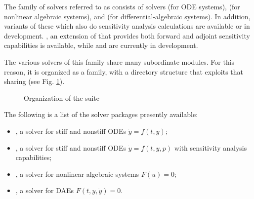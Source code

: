 %
The family of solvers referred to as {\sundials} consists of solvers
{\cvode} (for ODE systems), {\kinsol} (for nonlinear algebraic
systems), and {\ida} (for differential-algebraic systems).  In addition,
variants of these which also do sensitivity analysis calculations are
available or in development. {\cvodes}, an extension of {\cvode} that
provides both forward and adjoint sensitivity capabilities is available,
while {\idas} and {\kinsols} are currently in development.

The various solvers of this family share many subordinate modules.
For this reason, it is organized as a family, with a directory
structure that exploits that sharing (see Fig. \ref{f:sunorg}).
\begin{figure}
\caption {Organization of the {\sundials} suite}\label{f:sunorg}
\end{figure}
The following is a list of the solver packages presently available:
\begin{itemize}

\item {\cvode},  
  a solver for stiff and nonstiff ODEs $\dot y = f(t,y)$;

\item {\cvodes},
  a solver for stiff and nonstiff ODEs $\dot y = f(t,y,p)$
  with sensitivity analysis capabilities;

\item {\kinsol}, 
  a solver for nonlinear algebraic systems $F(u) = 0$;

\item {\ida},
  a solver for DAEs $F(t,y,\dot y) = 0$.

\end{itemize}